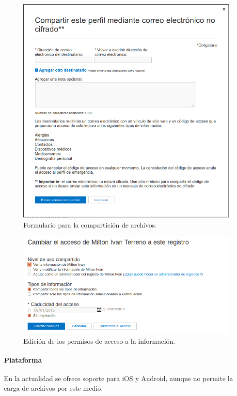 \begin{itemize}
	\begin{figure} 
      \centering
      \includegraphics[width=.8\textwidth]{img/tp1/3-compartir_perfil}
      \caption{Formulario para la compartición de archivos.}
      \label{compartir_perfil}
    \end{figure} 
    
    \begin{figure}[h]
      \centering
      \includegraphics[width=.8\textwidth]{img/tp1/3-cambiar_permisos}
      \caption{Edición de los permisos de acceso a la información.}
      \label{cambiar_permisos}
    \end{figure} 

\clearpage
\paragraph{Plataforma}



En la actualidad se ofrece soporte para iOS y Android, aunque no permite la carga de archivos por este medio.


\end{itemize}

